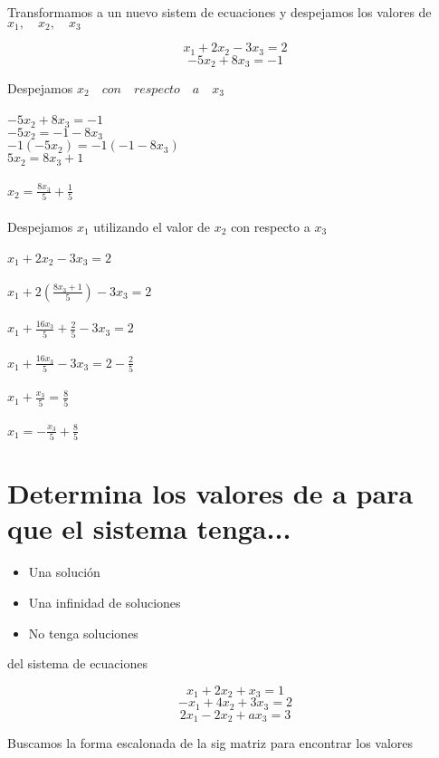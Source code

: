 \documentclass[a4paper,12pt]{article}
\begin{document}
Transformamos a un nuevo sistem de ecuaciones y despejamos los valores de \(x_1, \quad x_2, \quad x_3\)

\[x_1 + 2 x_2 - 3x_3 = 2\] 
\[-5x_2 + 8x_3 = -1 \]

Despejamos  \(x_2 \quad con \quad respecto \quad a \quad x_3\) \\ \\
\(-5x_2 +8x_3 = -1\) \\
\(-5x_2 = -1 - 8x_3  \) \\ 
\( -1 (-5x_2)= -1(-1 - 8x_3)  \) \\
\( 5x_2 = 8x_3 + 1  \) \\ \\
\(x_2 = \frac{8x_3}{5} + \frac{1}{5} \) \\\\

Despejamos \(x_1\) utilizando el valor de \(x_2\) con respecto a \(x_3\) \\\\
\(x_1+2x_2 - 3x_3 = 2\) \\ \\ 
\(x_1 + 2( \frac{8x_3 + 1}{5}) -3x_3 = 2\) \\ \\
\(x_1 + \frac{16x_3}{5} + \frac{2}{5} - 3x_3 = 2\) \\\\
\(x_1 + \frac{16x_3}{5} -3x_3 = 2 -\frac{2}{5}\) \\\\
\(x_1+\frac{x_3}{5} = \frac{8}{5}\) \\\\
\(x_1 = - \frac{x_3}{5} + \frac{8}{5}\)


\section{Determina los valores de a para que el sistema tenga...}
    \begin{itemize}[label=$\bullet$]
      \item  Una solución   
      \item Una infinidad de soluciones
      \item No tenga soluciones
    \end{itemize}

    del sistema de ecuaciones

    \[x_1+2x_2+x_3=1\]
    \[-x_1 + 4x_2 + 3x_3 = 2\]
    \[2x_1 - 2x_2+ ax_3 = 3\]

Buscamos la forma escalonada de la  sig matriz para encontrar los valores \\ \\
\end{document}

